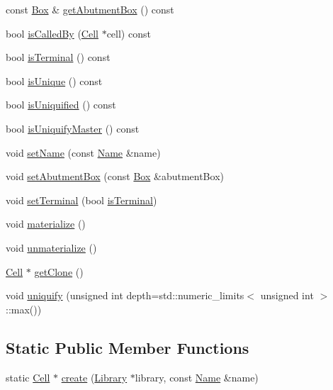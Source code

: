 \begin{DoxyCompactItemize}
\item 
const \hyperlink{classHurricane_1_1Box}{Box} \& \hyperlink{classHurricane_1_1Cell_a142360ca7b3c1c637894f5b9a2cac069}{get\+Abutment\+Box} () const
\item 
bool \hyperlink{classHurricane_1_1Cell_a239354e1b4ad9b751abf5a064e43b0e6}{is\+Called\+By} (\hyperlink{classHurricane_1_1Cell}{Cell} $\ast$cell) const
\item 
bool \hyperlink{classHurricane_1_1Cell_aac4e9218b7806f3a0f2d5a55f00abd69}{is\+Terminal} () const
\item 
bool \hyperlink{classHurricane_1_1Cell_a6c2f2fd9f6f6e0578937a90c0c37a507}{is\+Unique} () const
\item 
bool \hyperlink{classHurricane_1_1Cell_a86c21867e9ce896eae72fd2999ce8a2d}{is\+Uniquified} () const
\item 
bool \hyperlink{classHurricane_1_1Cell_a0220dbbbe730e6874f7620135e9c10f6}{is\+Uniquify\+Master} () const
\item 
void \hyperlink{classHurricane_1_1Cell_ad2c9face922062664110c66ee205eab2}{set\+Name} (const \hyperlink{classHurricane_1_1Name}{Name} \&name)
\item 
void \hyperlink{classHurricane_1_1Cell_ab1949e2b708f0bd2d215ab90cfe864e0}{set\+Abutment\+Box} (const \hyperlink{classHurricane_1_1Box}{Box} \&abutment\+Box)
\item 
void \hyperlink{classHurricane_1_1Cell_a4591dc37153a835daa42b442221742cb}{set\+Terminal} (bool \hyperlink{classHurricane_1_1Cell_aac4e9218b7806f3a0f2d5a55f00abd69}{is\+Terminal})
\item 
void \hyperlink{classHurricane_1_1Cell_affefc597317063857f4904d4b16d5d4f}{materialize} ()
\item 
void \hyperlink{classHurricane_1_1Cell_a40c9ba4e3fc76b0c4bc58af8dcaddf53}{unmaterialize} ()
\item 
\hyperlink{classHurricane_1_1Cell}{Cell} $\ast$ \hyperlink{classHurricane_1_1Cell_a092f53c7f517ecc70d9ba375296c5d5b}{get\+Clone} ()
\item 
void \hyperlink{classHurricane_1_1Cell_aa113c121813342b6304f3e7fddbc8565}{uniquify} (unsigned int depth=std\+::numeric\+\_\+limits$<$ unsigned int $>$\+::max())
\end{DoxyCompactItemize}
\subsection*{Static Public Member Functions}
\begin{DoxyCompactItemize}
\item 
static \hyperlink{classHurricane_1_1Cell}{Cell} $\ast$ \hyperlink{classHurricane_1_1Cell_ad803afb3e52bea3bf3d520e353b162e0}{create} (\hyperlink{classHurricane_1_1Library}{Library} $\ast$library, const \hyperlink{classHurricane_1_1Name}{Name} \&name)
\end{DoxyCompactItemize}


